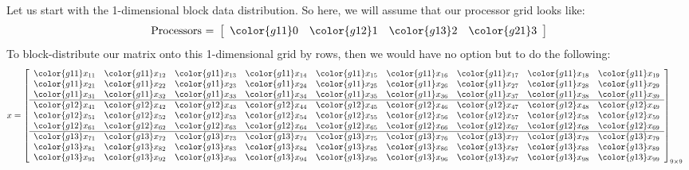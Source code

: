 Let us start with the 1-dimensional block data distribution.  So here, we will assume that our processor grid looks like:
\begin{align*}
\text{Processors = }
\left[
      \begin{array}{llll}
      \color{g11}0 & \color{g12}1 & \color{g13}2 & \color{g21}3
      \end{array}
\right]
\end{align*}
To block-distribute our matrix onto this 1-dimensional grid by rows, then we would have no option but to do the following:
\begin{align*}
x &= \left[
      \begin{array}{lllllllll}
      \color{g11}x_{11} & \color{g11}x_{12} & \color{g11}x_{13} & \color{g11}x_{14} & \color{g11}x_{15} & \color{g11}x_{16} & \color{g11}x_{17} & \color{g11}x_{18} & \color{g11}x_{19}\\
      \color{g11}x_{21} & \color{g11}x_{22} & \color{g11}x_{23} & \color{g11}x_{24} & \color{g11}x_{25} & \color{g11}x_{26} & \color{g11}x_{27} & \color{g11}x_{28} & \color{g11}x_{29}\\
      \color{g11}x_{31} & \color{g11}x_{32} & \color{g11}x_{33} & \color{g11}x_{34} & \color{g11}x_{35} & \color{g11}x_{36} & \color{g11}x_{37} & \color{g11}x_{38} & \color{g11}x_{39}\\\hline
      \color{g12}x_{41} & \color{g12}x_{42} & \color{g12}x_{43} & \color{g12}x_{44} & \color{g12}x_{45} & \color{g12}x_{46} & \color{g12}x_{47} & \color{g12}x_{48} & \color{g12}x_{49}\\
      \color{g12}x_{51} & \color{g12}x_{52} & \color{g12}x_{53} & \color{g12}x_{54} & \color{g12}x_{55} & \color{g12}x_{56} & \color{g12}x_{57} & \color{g12}x_{58} & \color{g12}x_{59}\\
      \color{g12}x_{61} & \color{g12}x_{62} & \color{g12}x_{63} & \color{g12}x_{64} & \color{g12}x_{65} & \color{g12}x_{66} & \color{g12}x_{67} & \color{g12}x_{68} & \color{g12}x_{69}\\\hline
      \color{g13}x_{71} & \color{g13}x_{72} & \color{g13}x_{73} & \color{g13}x_{74} & \color{g13}x_{75} & \color{g13}x_{76} & \color{g13}x_{77} & \color{g13}x_{78} & \color{g13}x_{79}\\
      \color{g13}x_{81} & \color{g13}x_{82} & \color{g13}x_{83} & \color{g13}x_{84} & \color{g13}x_{85} & \color{g13}x_{86} & \color{g13}x_{87} & \color{g13}x_{88} & \color{g13}x_{89}\\
      \color{g13}x_{91} & \color{g13}x_{92} & \color{g13}x_{93} & \color{g13}x_{94} & \color{g13}x_{95} & \color{g13}x_{96} & \color{g13}x_{97} & \color{g13}x_{98} & \color{g13}x_{99}\\
      \end{array}
\right]_{9\times 9}
\end{align*}
